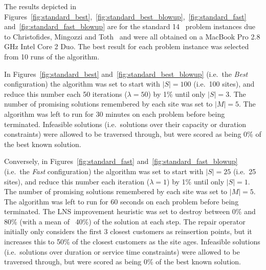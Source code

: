 



The results depicted in Figures~\ref{fig:standard_best},~\ref{fig:standard_best_blowup},~\ref{fig:standard_fast} and~\ref{fig:standard_fast_blowup} are for the standard 14 \VRP\ problem instances due to Christofides, Mingozzi and Toth~\cite{CMT:1981} and were all obtained on a MacBook Pro 2.8 GHz Intel Core 2 Duo. The best result for each problem instance was selected from 10 runs of the algorithm. 

In Figures~\ref{fig:standard_best} and~\ref{fig:standard_best_blowup} (i.e.~the \emph{Best} configuration) the algorithm was set to start with $|S| = 100$ (i.e.~100 sites), and reduce this number each 50 iterations ($\lambda = 50$) by 1\% until only $|S| = 3$. The number of promising solutions remembered by each site was set to $|M| = 5$. The algorithm was left to run for 30 minutes on each problem before being terminated. Infeasible solutions (i.e.~solutions over their capacity or duration constraints) were allowed to be traversed through, but were scored as being 0\% of the best known solution.

Conversely, in Figures~\ref{fig:standard_fast} and~\ref{fig:standard_fast_blowup} (i.e.~the \emph{Fast} configuration) the algorithm was set to start with $|S| = 25$ (i.e.~25 sites), and reduce this number each iteration ($\lambda = 1$) by 1\% until only $|S| = 1$. The number of promising solutions remembered by each site was set to $|M| = 5$. The algorithm was left to run for 60 seconds on each problem before being terminated. The LNS improvement heuristic was set to destroy between 0\% and 80\% (with a mean of ~40\%) of the solution at each step. The repair operator initially only considers the first 3 closest customers as reinsertion points, but it increases this to 50\% of the closest customers as the site ages. Infeasible solutions (i.e.~solutions over duration or service time constraints) were allowed to be traversed through, but were scored as being 0\% of the best known solution.

